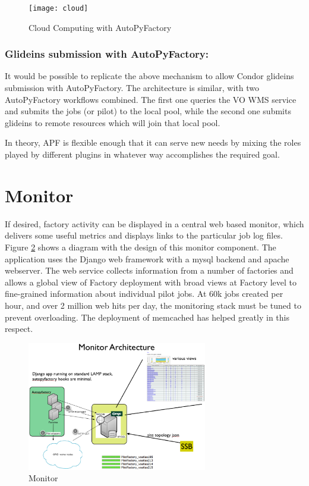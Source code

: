 \documentclass[a4paper]{jpconf}
\begin{document}
\begin{figure}[h]
\centering\texttt{[image: cloud]}
\caption{Cloud Computing with AutoPyFactory}
\label{cloud}
\end{figure}

\subsubsection{Glideins submission with AutoPyFactory:}
It would be possible to replicate the above mechanism to allow Condor glideins submission with AutoPyFactory.
The architecture is similar, with two AutoPyFactory workflows combined.
The first one queries the VO WMS service and submits the jobs (or pilot) to the local pool, 
while the second one submits glideins to remote resources which will join that local pool. 

In theory, APF is flexible enough that it can serve new needs by mixing the
roles played by different plugins in whatever way accomplishes the required goal. 

\section{Monitor}

If desired, factory activity can be displayed in a central web based monitor,
which delivers some useful metrics and displays links to the particular job log
files. Figure \ref{monitor} shows a diagram with the design of this monitor component.
The application uses the Django web framework with a mysql backend and apache webserver. 
The web service collects information from a number of
factories and allows a global view of Factory deployment with broad
views at Factory level to fine-grained information about individual pilot jobs. 
At 60k jobs created per hour, and over 2 million web hits per day, 
the monitoring stack must be tuned to prevent overloading.
The deployment of memcached has helped greatly in this respect.


\begin{figure}[h]
\centering\includegraphics[width=0.7\textwidth]{monitor}
\caption{Monitor}
\label{monitor}
\end{figure}
\end{document}
